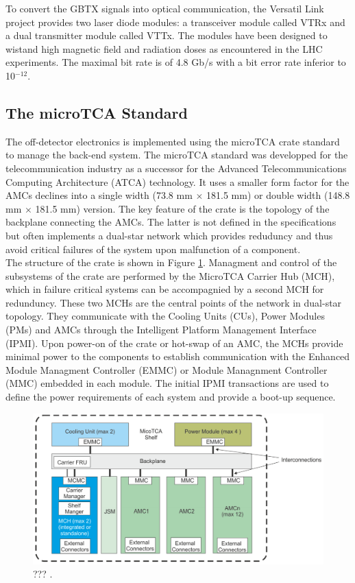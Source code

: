       To convert the GBTX signals into optical communication, the Versatil Link project provides two laser diode modules: a transceiver module called VTRx and a dual transmitter module called VTTx. The modules have been designed to wistand high magnetic field and radiation doses as encountered in the LHC experiments. The maximal bit rate is of 4.8 Gb/s with a bit error rate inferior to 10$^{-12}$.

    \subsection{The microTCA Standard}

      The off-detector electronics is implemented using the microTCA crate standard to manage the back-end system. The microTCA standard was developped for the telecommunication industry as a successor for the Advanced Telecommunications Computing Architecture (ATCA) technology. It uses a smaller form factor for the AMCs declines into a single width (73.8 mm $ \times $ 181.5 mm) or double width (148.8 mm $ \times $ 181.5 mm) version. The key feature of the crate is the topology of the backplane connecting the AMCs. The latter is not defined in the specifications but often implements a dual-star network which provides reduduncy and thus avoid critical failures of the system upon malfunction of a component. \\

      The structure of the crate is shown in Figure \ref{fig:II-2-daq-utca-crate}. Managment and control of the subsystems of the crate are performed by the MicroTCA Carrier Hub (MCH), which in failure critical systems can be accompagnied by a second MCH for redunduncy. These two MCHs are the central points of the network in dual-star topology. They communicate with the Cooling Units (CUs), Power Modules (PMs) and AMCs through the Intelligent Platform Management Interface (IPMI). Upon power-on of the crate or hot-swap of an AMC, the MCHs provide minimal power to the components to establish communication with the Enhanced Module Managment Controller (EMMC) or Module Managnment Controller (MMC) embedded in each module. The initial IPMI transactions are used to define the power requirements of each system and provide a boot-up sequence. 

      \begin{figure}[h!]
        \centering
        \includegraphics[width=\textwidth]{img/II-2-daq/utca-crate.png}
        \caption{??? \cite{VADATECH}.}
        \label{fig:II-2-daq-utca-crate}
      \end{figure}

